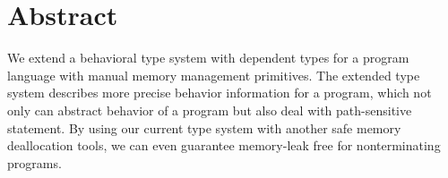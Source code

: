 \section{Abstract}
\label{sec:abstraction}
We extend a behavioral type system with dependent types for a program
language with manual memory management primitives. The extended type system
describes more precise behavior information for a program, which not
only can abstract behavior of a program but also deal with
path-sensitive statement. By using our current type system with
another safe memory deallocation tools, we can even guarantee
memory-leak free for nonterminating programs.

 
